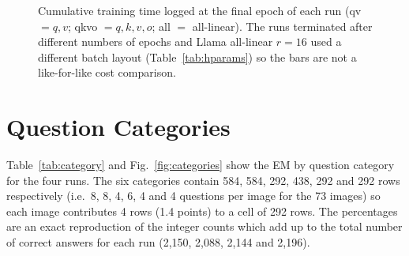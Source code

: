 \documentclass[12pt]{report}
\begin{document}
\begin{figure}[htbp]
  \centering
  \caption{Cumulative training time logged at the final epoch of each run (qv $=q,v$; qkvo $=q,k,v,o$; all $=$ all-linear). The runs terminated after different numbers of epochs and Llama all-linear $r{=}16$ used a different batch layout (Table~\ref{tab:hparams}) so the bars are not a like-for-like cost comparison.}
  \label{fig:minutes}
\end{figure}


\section{Question Categories}
Table~\ref{tab:category} and Fig.~\ref{fig:categories} show the EM by question category for the four runs. The six categories contain 584, 584, 292, 438, 292 and 292 rows respectively (i.e.\ 8, 8, 4, 6, 4 and 4 questions per image for the 73 images) so each image contributes 4 rows (1.4 points) to a cell of 292 rows. The percentages are an exact reproduction of the integer counts which add up to the total number of correct answers for each run (2,150, 2,088, 2,144 and 2,196).


\end{document}
